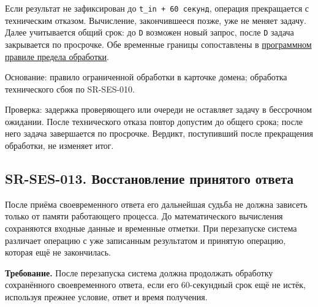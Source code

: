\documentclass[12pt,a4paper]{article}
\begin{document}
Если результат не зафиксирован до \texttt{t\_in\ +\ 60\ секунд}, операция прекращается с техническим отказом. Вычисление, закончившееся позже, уже не меняет задачу. Далее учитывается общий срок: до \texttt{D} возможен новый запрос, после \texttt{D} задача закрывается по просрочке. Обе временные границы сопоставлены в \href{../07_\%D0\%9F\%D1\%80\%D0\%BE\%D0\%B3\%D1\%80\%D0\%B0\%D0\%BC\%D0\%BC\%D0\%BD\%D1\%8B\%D0\%B5_\%D1\%82\%D1\%80\%D0\%B5\%D0\%B1\%D0\%BE\%D0\%B2\%D0\%B0\%D0\%BD\%D0\%B8\%D1\%8F/DOC-06.2_\%D0\%A1\%D0\%B5\%D1\%81\%D1\%81\%D0\%B8\%D0\%B8_\%D0\%B7\%D0\%B0\%D0\%B4\%D0\%B0\%D1\%87_\%D0\%B8_\%D0\%BF\%D0\%BB\%D0\%B0\%D0\%BD\%D0\%B8\%D1\%80\%D0\%BE\%D0\%B2\%D1\%89\%D0\%B8\%D0\%BA.pdf\#nameddest=swr-ses-020-\%D0\%BF\%D1\%80\%D0\%B5\%D0\%B4\%D0\%B5\%D0\%BB-\%D0\%BE\%D0\%B1\%D1\%80\%D0\%B0\%D0\%B1\%D0\%BE\%D1\%82\%D0\%BA\%D0\%B8}{программном правиле предела обработки}.

Основание: правило ограниченной обработки в карточке домена; обработка технического сбоя по SR-SES-010.

Проверка: задержка проверяющего или очереди не оставляет задачу в бессрочном ожидании. После технического отказа повтор допустим до общего срока; после него задача завершается по просрочке. Вердикт, поступивший после прекращения обработки, не изменяет итог.

\subsection{SR-SES-013. Восстановление принятого ответа}\label{sr-ses-013-ux432ux43eux441ux441ux442ux430ux43dux43eux432ux43bux435ux43dux438ux435-ux43fux440ux438ux43dux44fux442ux43eux433ux43e-ux43eux442ux432ux435ux442ux430}

\hypertarget{sr-ses-013-восстановление-принятого-ответа}{}

После приёма своевременного ответа его дальнейшая судьба не должна зависеть только от памяти работающего процесса. До математического вычисления сохраняются входные данные и временные отметки. При перезапуске система различает операцию с уже записанным результатом и принятую операцию, которая ещё не закончилась.

\textbf{Требование.} После перезапуска система должна продолжать обработку сохранённого своевременного ответа, если его 60-секундный срок ещё не истёк, используя прежнее условие, ответ и время получения.
\end{document}
